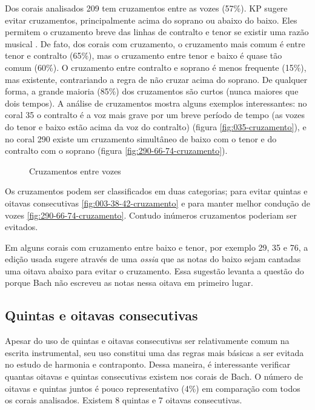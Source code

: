Dos corais analisados 209 tem cruzamentos entre as vozes (57\%). KP
sugere evitar cruzamentos, principalmente acima do soprano ou abaixo
do baixo. Eles permitem o cruzamento breve das linhas de contralto e
tenor se existir uma razão musical \cite[p. 79]{kostka.ea00:tonal}. De
fato, dos corais com cruzamento, o cruzamento mais comum é entre tenor
e contralto (65\%), mas o cruzamento entre tenor e baixo é quase tão
comum (60\%). O cruzamento entre contralto e soprano é menos frequente
(15\%), mas existente, contrariando a regra de não cruzar acima do
soprano. De qualquer forma, a grande maioria (85\%) dos cruzamentos
são curtos (nunca maiores que dois tempos). A análise de cruzamentos
mostra alguns exemplos interessantes: no coral 35 o contralto é a voz
mais grave por um breve período de tempo (as vozes do tenor e baixo
estão acima da voz do contralto) (figura \ref{fig:035-cruzamento}), e
no coral 290 existe um cruzamento simultâneo de baixo com o tenor e do
contralto com o soprano (figura \ref{fig:290-66-74-cruzamento}).

\begin{figure}
  \centering
  \caption{Cruzamentos entre vozes}
  \label{fig:coral-003}
\end{figure}

Os cruzamentos podem ser classificados em duas categorias; para evitar
quintas e oitavas consecutivas \ref{fig:003-38-42-cruzamento} e para
manter melhor condução de vozes \ref{fig:290-66-74-cruzamento}.
Contudo inúmeros cruzamentos poderiam ser evitados.

Em alguns corais com cruzamento entre baixo e tenor, por exemplo 29,
35 e 76, a edição usada sugere através de uma \textit{ossia} que as
notas do baixo sejam cantadas uma oitava abaixo para evitar o
cruzamento. Essa sugestão levanta a questão do porque Bach não
escreveu as notas nessa oitava em primeiro lugar.

\subsection{Quintas e oitavas consecutivas}
\label{sec:quintas-e-oitavas}

Apesar do uso de quintas e oitavas consecutivas ser relativamente
comum na escrita instrumental, seu uso constitui uma das regras mais
básicas a ser evitada no estudo de harmonia e contraponto. Dessa
maneira, é interessante verificar quantas oitavas e quintas
consecutivas existem nos corais de Bach. O número de oitavas e quintas
juntos é pouco representativo (4\%) em comparação com todos os corais
analisados. Existem 8 quintas e 7 oitavas consecutivas.


